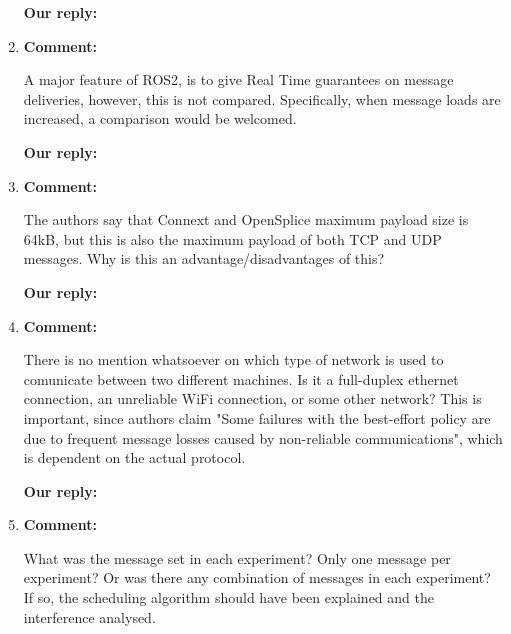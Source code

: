 \documentclass{article}
\begin{document}
\begin{enumerate}
\begin{flushleft}
  \textbf{Our reply:}
\end{flushleft}


\item \begin{flushleft}
  \textbf{Comment:}
\end{flushleft}
A major feature of ROS2, is to give Real Time guarantees on message deliveries, however, this is not compared. Specifically, when message loads are increased, a comparison would be welcomed.

\begin{flushleft}
  \textbf{Our reply:}
\end{flushleft}

\item \begin{flushleft}
  \textbf{Comment:}
\end{flushleft}
The authors say that Connext and OpenSplice maximum payload size is 64kB, but this is also the maximum payload of both TCP and UDP messages. Why is this an advantage/disadvantages of this?

\begin{flushleft}
  \textbf{Our reply:}
\end{flushleft}


\item \begin{flushleft}
  \textbf{Comment:}
\end{flushleft}
There is no mention whatsoever on which type of network is used to comunicate between two different machines. Is it a full-duplex ethernet connection, an unreliable WiFi connection, or some other network?
This is important, since authors claim "Some failures with the best-effort policy are due to frequent message losses caused by non-reliable communications", which is dependent on the actual protocol.

\begin{flushleft}
  \textbf{Our reply:}
\end{flushleft}


\item \begin{flushleft}
  \textbf{Comment:}
\end{flushleft}
What was the message set in each experiment? Only one message per experiment? Or was there any combination of messages in each experiment? If so, the scheduling algorithm should have been explained and the interference analysed.


\end{enumerate}
\end{document}
